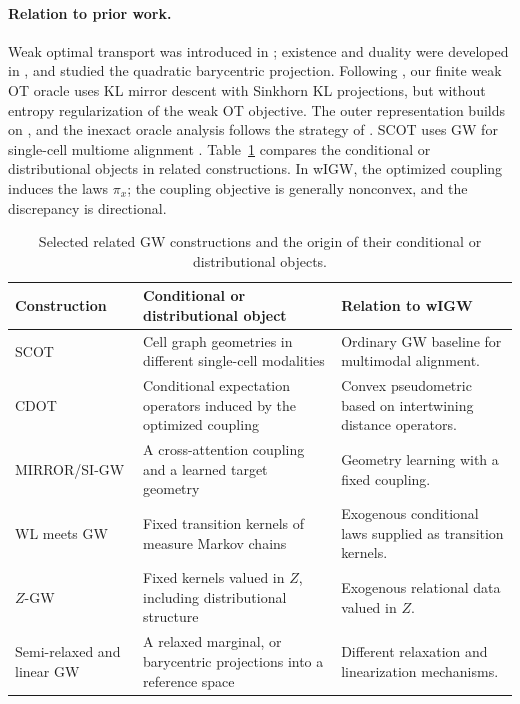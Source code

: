 \documentclass[11pt]{article}
\theoremstyle{plain}
\theoremstyle{definition}
\theoremstyle{remark}
\begin{document}
\catcloudsfigure
\FloatBarrier

\paragraph{Relation to prior work.}
Weak optimal transport was introduced in \cite{GRST}; existence and duality were
developed in \cite{BBP}, and \cite{GozlanJuillet} studied the quadratic barycentric
projection. Following \cite{PatyChoneKramarz2022}, our finite weak OT oracle uses KL
mirror descent with Sinkhorn KL projections, but without entropy regularization of the
weak OT objective. The outer representation builds on \cite{ZhangGoldfeldMrouehSriperumbudur},
and the inexact oracle analysis follows the strategy of \cite{RiouxGoldfeldKato2024}.
SCOT uses GW for single-cell multiome alignment \cite{DemetciEtAl2022}.
Table~\ref{tab:prior-comparison} compares the conditional or distributional objects in
related constructions. In wIGW, the optimized coupling induces the laws $\pi_x$; the
coupling objective is generally nonconvex, and the discrepancy is directional.

\begin{table}[H]
\centering
\footnotesize
\renewcommand{\arraystretch}{1.05}
\begin{tabularx}{\textwidth}{@{}>{\raggedright\arraybackslash}p{}
  >{\raggedright\arraybackslash}p{}
  >{\raggedright\arraybackslash}X@{}}
\toprule
Construction & Conditional or distributional object & Relation to wIGW\\
\midrule
SCOT \cite{DemetciEtAl2022} & Cell graph geometries in different
single-cell modalities & Ordinary GW baseline for multimodal alignment.\\
CDOT \cite{ChungSongKimPark} & Conditional expectation operators induced by the
optimized coupling & Convex pseudometric based on intertwining distance operators.\\
MIRROR/SI-GW \cite{WangWangDing2026} & A cross-attention coupling and a learned
target geometry & Geometry learning with a fixed coupling.\\
WL meets GW \cite{ChenLimMemoliWanWang} & Fixed transition kernels of measure
Markov chains & Exogenous conditional laws supplied as transition kernels.\\
$Z$-GW \cite{BauerMemoliNeedhamNishino} & Fixed kernels valued in $Z$, including
distributional structure & Exogenous relational data valued in $Z$.\\
Semi-relaxed and linear GW \cite{VincentCuazEtAl,BeierBeinertSteidl} & A relaxed
marginal, or barycentric projections into a reference space & Different relaxation and
linearization mechanisms.\\
\bottomrule
\end{tabularx}
\caption{Selected related GW constructions and the origin of their conditional or
distributional objects.}
\label{tab:prior-comparison}
\end{table}
\end{document}
